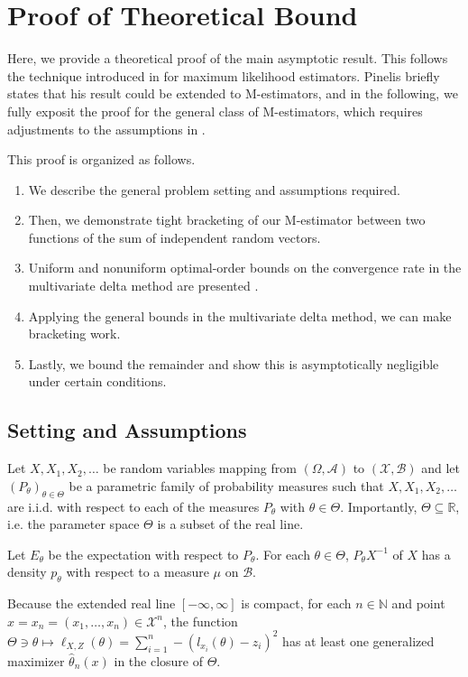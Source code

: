 \section*{Proof of Theoretical Bound}
Here, we provide a theoretical proof of the main asymptotic result. This follows the technique introduced in \cite{Pinelis2017} for maximum likelihood estimators. Pinelis briefly states that his result could be extended to M-estimators, and in the following, we fully exposit the proof for the general class of M-estimators, which requires adjustments to the assumptions in \cite{Pinelis2017}.

This proof is organized as follows.

\begin{enumerate}
	\item We describe the general problem setting and assumptions required.
	\item Then, we demonstrate tight bracketing of our M-estimator between two functions of the sum of independent random vectors.
	\item Uniform and nonuniform optimal-order bounds on the convergence rate in the multivariate delta method are presented \cite{Pinelis2016}.
	\item Applying the general bounds in the multivariate delta method, we can make bracketing work.
	\item Lastly, we bound the remainder and show this is asymptotically negligible under certain conditions.
\end{enumerate}

\subsection*{Setting and Assumptions}

Let $X, X_1, X_2, \ldots$ be random variables mapping from $(\Omega, \mathcal{A})$ to $(\mathcal{X},\mathcal{B})$ and let $(P_{\theta})_{\theta\in \Theta}$ be a parametric family of probability measures such that $X, X_1, X_2, \ldots$ are i.i.d. with respect to each of the measures $P_{\theta}$ with $\theta \in \Theta$. Importantly, $\Theta\subseteq \mathbb{R}$, i.e. the parameter space $\Theta$ is a subset of the real line.

Let $E_{\theta}$ be the expectation with respect to $P_{\theta}$. For each $\theta\in \Theta$, $P_{\theta} X^{-1}$ of $X$ has a density $p_{\theta}$ with respect to a measure $\mu$ on $\mathcal{B}$.

Because the extended real line $[-\infty,\infty]$ is compact, for each $n\in \mathbb{N}$ and point $x=x_n=(x_1,\ldots,x_n)\in \mathcal{X}^n$, the function $\Theta\ni \theta\mapsto \ell_{X,Z}(\theta) = \sum_{i=1}^n -(l_{x_i}(\theta)-z_i)^2 $ has at least one generalized maximizer $\hat{\theta}_n(x)$ in the closure of $\Theta$.

